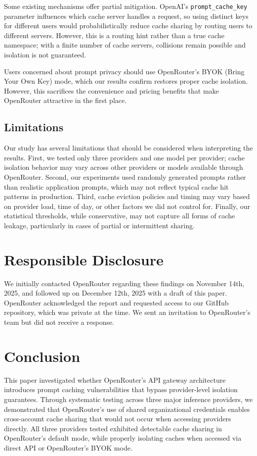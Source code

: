 \documentclass[conference]{IEEEtran}
\begin{document}
Some existing mechanisms offer partial mitigation.
OpenAI's \texttt{prompt\_cache\_key} parameter influences which cache server handles a request, so using distinct keys for different users would probabilistically reduce cache sharing by routing users to different servers.
However, this is a routing hint rather than a true cache namespace; with a finite number of cache servers, collisions remain possible and isolation is not guaranteed.

Users concerned about prompt privacy should use OpenRouter's BYOK (Bring Your Own Key) mode, which our results confirm restores proper cache isolation.
However, this sacrifices the convenience and pricing benefits that make OpenRouter attractive in the first place.

\subsection{Limitations}

Our study has several limitations that should be considered when interpreting the results.
First, we tested only three providers and one model per provider; cache isolation behavior may vary across other providers or models available through OpenRouter.
Second, our experiments used randomly generated prompts rather than realistic application prompts, which may not reflect typical cache hit patterns in production.
Third, cache eviction policies and timing may vary based on provider load, time of day, or other factors we did not control for.
Finally, our statistical thresholds, while conservative, may not capture all forms of cache leakage, particularly in cases of partial or intermittent sharing.

\section*{Responsible Disclosure}
We initially contacted OpenRouter regarding these findings on November 14th, 2025, and followed up on December 12th, 2025 with a draft of this paper. 
OpenRouter acknowledged the report and requested access to our GitHub repository, which was private at the time.
We sent an invitation to OpenRouter's team but did not receive a response.

\section{Conclusion}
\label{sec:conclusion}

This paper investigated whether OpenRouter's API gateway architecture introduces prompt caching vulnerabilities that bypass provider-level isolation guarantees.
Through systematic testing across three major inference providers, we demonstrated that OpenRouter's use of shared organizational credentials enables cross-account cache sharing that would not occur when accessing providers directly.
All three providers tested exhibited detectable cache sharing in OpenRouter's default mode, while properly isolating caches when accessed via direct API or OpenRouter's BYOK mode.
\end{document}
